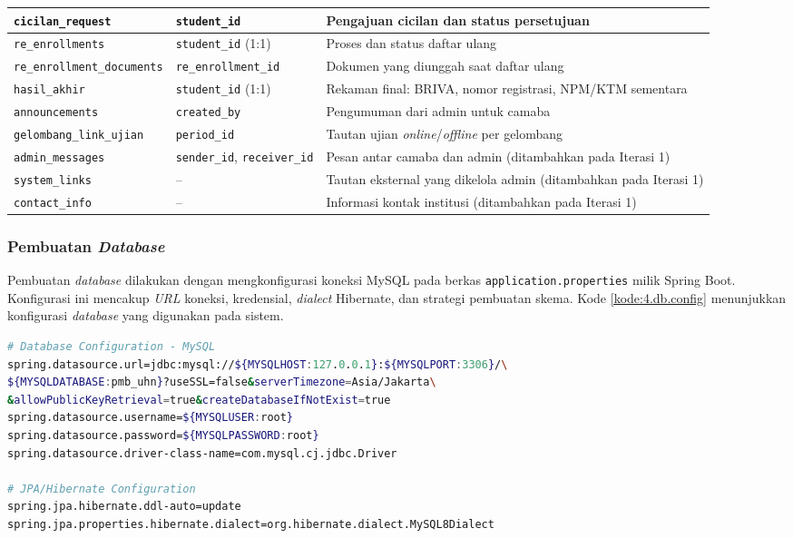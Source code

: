 \begin{longtable}{|L{0.30\textwidth}|L{0.18\textwidth}|L{0.38\textwidth}|}
	\hline
	\texttt{cicilan\_request} & \texttt{student\_id} & Pengajuan cicilan dan status persetujuan \\
	\hline
	\texttt{re\_enrollments} & \texttt{student\_id} (1:1) & Proses dan status daftar ulang \\
	\hline
	\texttt{re\_enrollment\_documents} & \texttt{re\_enrollment\_id} & Dokumen yang diunggah saat daftar ulang \\
	\hline
	\texttt{hasil\_akhir} & \texttt{student\_id} (1:1) & Rekaman final: BRIVA, nomor registrasi, NPM/KTM sementara \\
	\hline
	\texttt{announcements} & \texttt{created\_by} & Pengumuman dari admin untuk camaba \\
	\hline
	\texttt{gelombang\_link\_ujian} & \texttt{period\_id} & Tautan ujian \textit{online}/\textit{offline} per gelombang \\
	\hline
	\texttt{admin\_messages} & \texttt{sender\_id}, \texttt{receiver\_id} & Pesan antar camaba dan admin (ditambahkan pada Iterasi 1) \\
	\hline
	\texttt{system\_links} & -- & Tautan eksternal yang dikelola admin (ditambahkan pada Iterasi 1) \\
	\hline
	\texttt{contact\_info} & -- & Informasi kontak institusi (ditambahkan pada Iterasi 1) \\
	\hline
\end{longtable}

\subsubsection{Pembuatan \textit{Database}} \label{IV.DB.Setup}

Pembuatan \textit{database} dilakukan dengan mengkonfigurasi koneksi MySQL pada berkas \texttt{application.properties} milik Spring Boot. Konfigurasi ini mencakup \textit{URL} koneksi, kredensial, \textit{dialect} Hibernate, dan strategi pembuatan skema. Kode \ref{kode:4.db.config} menunjukkan konfigurasi \textit{database} yang digunakan pada sistem.\par

\begin{lstlisting}[language=bash, caption={Konfigurasi koneksi MySQL pada application.properties}, label={kode:4.db.config}]
# Database Configuration - MySQL
spring.datasource.url=jdbc:mysql://${MYSQLHOST:127.0.0.1}:${MYSQLPORT:3306}/\
${MYSQLDATABASE:pmb_uhn}?useSSL=false&serverTimezone=Asia/Jakarta\
&allowPublicKeyRetrieval=true&createDatabaseIfNotExist=true
spring.datasource.username=${MYSQLUSER:root}
spring.datasource.password=${MYSQLPASSWORD:root}
spring.datasource.driver-class-name=com.mysql.cj.jdbc.Driver

# JPA/Hibernate Configuration
spring.jpa.hibernate.ddl-auto=update
spring.jpa.properties.hibernate.dialect=org.hibernate.dialect.MySQL8Dialect
\end{lstlisting}

